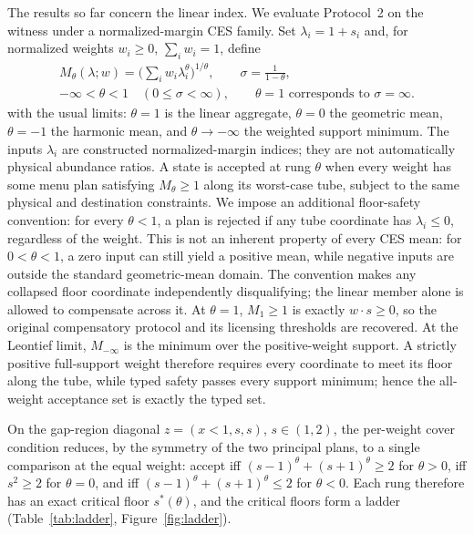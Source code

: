 The results so far concern the linear index. We evaluate Protocol~2 on the witness under a normalized-margin CES family. Set $\lambda_i=1+s_i$ and, for normalized weights $w_i\ge0$, $\sum_iw_i=1$, define
\[
\begin{gathered}
M_\theta(\lambda;w)=\Big(\sum_iw_i\lambda_i^\theta\Big)^{1/\theta},\qquad \sigma=\frac1{1-\theta},\\
-\infty<\theta<1\quad(0\le\sigma<\infty),\qquad \theta=1\text{ corresponds to }\sigma=\infty.
\end{gathered}
\]
with the usual limits: $\theta=1$ is the linear aggregate, $\theta=0$ the geometric mean, $\theta=-1$ the harmonic mean, and $\theta\to-\infty$ the weighted support minimum. The inputs $\lambda_i$ are constructed normalized-margin indices; they are not automatically physical abundance ratios. A state is accepted at rung $\theta$ when every weight has some menu plan satisfying $M_\theta\ge1$ along its worst-case tube, subject to the same physical and destination constraints. We impose an additional floor-safety convention: for every $\theta<1$, a plan is rejected if any tube coordinate has $\lambda_i\le0$, regardless of the weight. This is not an inherent property of every CES mean: for $0<\theta<1$, a zero input can still yield a positive mean, while negative inputs are outside the standard geometric-mean domain. The convention makes any collapsed floor coordinate independently disqualifying; the linear member alone is allowed to compensate across it. At $\theta=1$, $M_1\ge1$ is exactly $w\cdot s\ge0$, so the original compensatory protocol and its licensing thresholds are recovered. At the Leontief limit, $M_{-\infty}$ is the minimum over the positive-weight support. A strictly positive full-support weight therefore requires every coordinate to meet its floor along the tube, while typed safety passes every support minimum; hence the all-weight acceptance set is exactly the typed set.

On the gap-region diagonal $z=(x<1,s,s)$, $s\in(1,2)$, the per-weight cover condition reduces, by the symmetry of the two principal plans, to a single comparison at the equal weight: accept iff $(s-1)^\theta+(s+1)^\theta\ge2$ for $\theta>0$, iff $s^2\ge2$ for $\theta=0$, and iff $(s-1)^\theta+(s+1)^\theta\le2$ for $\theta<0$. Each rung therefore has an exact critical floor $s^*(\theta)$, and the critical floors form a ladder (Table~\ref{tab:ladder}, Figure~\ref{fig:ladder}).

